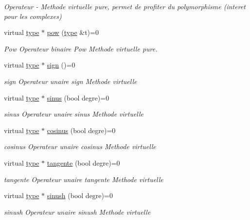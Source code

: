 \begin{DoxyCompactItemize}
\begin{DoxyCompactList}\small\item\em Operateur -\/ Methode virtuelle pure, permet de profiter du polymorphisme (interet pour les complexes) \end{DoxyCompactList}\item 
virtual \hyperlink{classtype}{type} $\ast$ \hyperlink{classnocomplex_a1ad1b692783c8449efb03cc0dc5d1f3c}{pow} (\hyperlink{classtype}{type} \&t)=0
\begin{DoxyCompactList}\small\item\em Pow Operateur binaire Pow Methode virtuelle pure. \end{DoxyCompactList}\item 
virtual \hyperlink{classtype}{type} $\ast$ \hyperlink{classnocomplex_acd1c0365d1a2ed160934320cff01cecd}{sign} ()=0
\begin{DoxyCompactList}\small\item\em sign Operateur unaire sign Methode virtuelle \end{DoxyCompactList}\item 
virtual \hyperlink{classtype}{type} $\ast$ \hyperlink{classnocomplex_aea2ba416f34c37ad2cf751b6220d53b8}{sinus} (bool degre)=0
\begin{DoxyCompactList}\small\item\em sinus Operateur unaire sinus Methode virtuelle \end{DoxyCompactList}\item 
virtual \hyperlink{classtype}{type} $\ast$ \hyperlink{classnocomplex_a2c3aa4791fe0c123079b0332a5978939}{cosinus} (bool degre)=0
\begin{DoxyCompactList}\small\item\em cosinus Operateur unaire cosinus Methode virtuelle \end{DoxyCompactList}\item 
virtual \hyperlink{classtype}{type} $\ast$ \hyperlink{classnocomplex_a2e7f4563e7d602c79e356dcb5472e341}{tangente} (bool degre)=0
\begin{DoxyCompactList}\small\item\em tangente Operateur unaire tangente Methode virtuelle \end{DoxyCompactList}\item 
virtual \hyperlink{classtype}{type} $\ast$ \hyperlink{classnocomplex_a4df698a9ee147b77aaab9f63840b1012}{sinush} (bool degre)=0
\begin{DoxyCompactList}\small\item\em sinush Operateur unaire sinush Methode virtuelle \end{DoxyCompactList}\item 

\end{DoxyCompactItemize}
